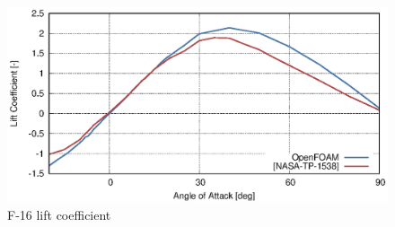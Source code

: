 \begin{figure}
  \centering
  \includegraphics[width=140mm]{eps/openfoam_f16_cz.eps}
  \caption{F-16 lift coefficient}
  \label{fig-cfd-result-openfoam-cz}
\end{figure}
